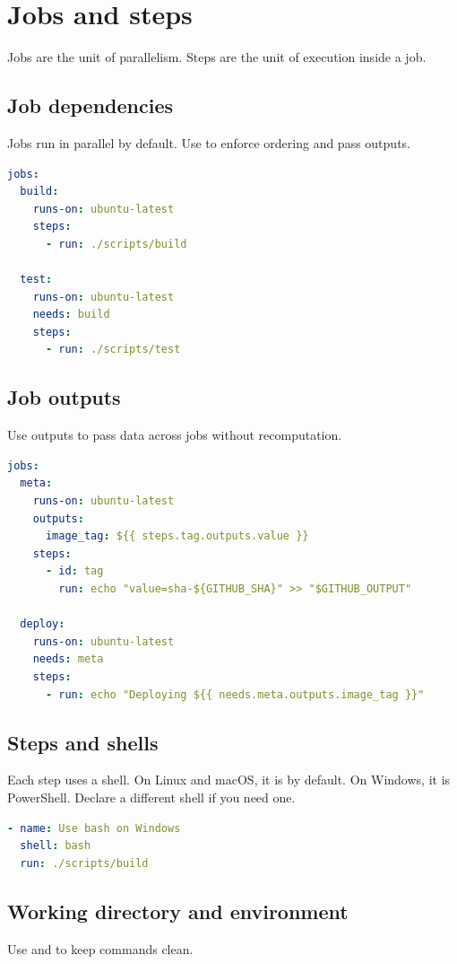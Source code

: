 \chapter{Jobs and steps}

Jobs are the unit of parallelism.
Steps are the unit of execution inside a job.

\section{Job dependencies}
Jobs run in parallel by default.
Use  to enforce ordering and pass outputs.

\begin{lstlisting}[language=YAML]
jobs:
  build:
    runs-on: ubuntu-latest
    steps:
      - run: ./scripts/build

  test:
    runs-on: ubuntu-latest
    needs: build
    steps:
      - run: ./scripts/test
\end{lstlisting}

\section{Job outputs}
Use outputs to pass data across jobs without recomputation.

\begin{lstlisting}[language=YAML]
jobs:
  meta:
    runs-on: ubuntu-latest
    outputs:
      image_tag: ${{ steps.tag.outputs.value }}
    steps:
      - id: tag
        run: echo "value=sha-${GITHUB_SHA}" >> "$GITHUB_OUTPUT"

  deploy:
    runs-on: ubuntu-latest
    needs: meta
    steps:
      - run: echo "Deploying ${{ needs.meta.outputs.image_tag }}"
\end{lstlisting}

\section{Steps and shells}
Each  step uses a shell.
On Linux and macOS, it is  by default.
On Windows, it is PowerShell.
Declare a different shell if you need one.

\begin{lstlisting}[language=YAML]
- name: Use bash on Windows
  shell: bash
  run: ./scripts/build
\end{lstlisting}

\section{Working directory and environment}
Use  and  to keep commands clean.

